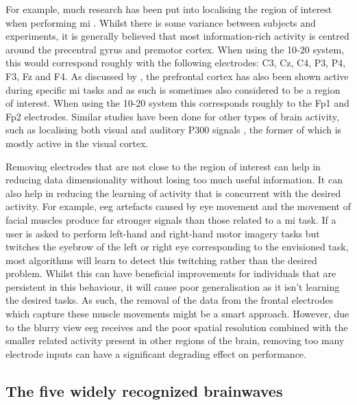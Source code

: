 For example, much research has been put into localising the region of interest when performing \gls{mi} \citep{mi_location1, mi_location2, mi_location3, mi_location4, mi_location5, mi_location6}.
Whilst there is some variance between subjects and experiments, it is generally believed that most information-rich activity is centred around the precentral gyrus and premotor cortex.
When using the 10-20 system, this would correspond roughly with the following electrodes: C3, Cz, C4, P3, P4, F3, Fz and F4.
As discussed by \citet{mi_location6}, the prefrontal cortex has also been shown active during specific \gls{mi} tasks and as such is sometimes also considered to be a region of interest.
When using the 10-20 system this corresponds roughly to the Fp1 and Fp2 electrodes.
Similar studies have been done for other types of brain activity, such as localising both visual and auditory P300 signals \citep{p300_location}, the former of which is mostly active in the visual cortex.

Removing electrodes that are not close to the region of interest can help in reducing data dimensionality without losing too much useful information.
It can also help in reducing the learning of activity that is concurrent with the desired activity.
For example, \gls{eeg} artefacts caused by eye movement and the movement of facial muscles produce far stronger signals than those related to a \gls{mi} task.
If a user is asked to perform left-hand and right-hand motor imagery tasks but twitches the eyebrow of the left or right eye corresponding to the envisioned task, most algorithms will learn to detect this twitching rather than the desired problem.
Whilst this can have beneficial improvements for individuals that are persistent in this behaviour, it will cause poor generalisation as it isn't learning the desired tasks.
As such, the removal of the data from the frontal electrodes which capture these muscle movements might be a smart approach.
However, due to the blurry view \gls{eeg} receives and the poor spatial resolution combined with the smaller related activity present in other regions of the brain, removing too many electrode inputs can have a significant degrading effect on performance.



\subsection{The five widely recognized brainwaves}
\label{subsec:biomedical_signals_working_with_eeg_brain_waves}


